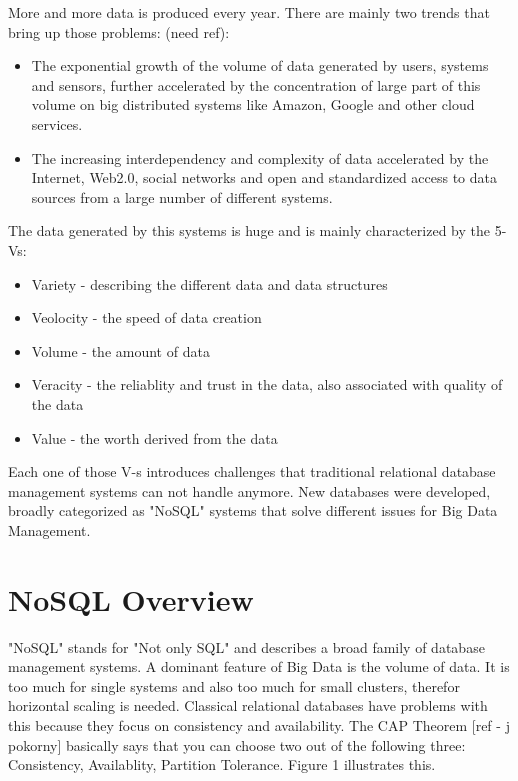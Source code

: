 \documentclass{acm_proc_article-sp}
\begin{document}
More and more data is produced every year. There are mainly two trends that bring up those problems: (need ref):
\begin{itemize}
	\item The exponential growth of the volume of data generated by users, systems and sensors, further accelerated by the concentration of large part of this volume on big distributed systems like Amazon, Google and other cloud services. 
	\item The increasing interdependency and complexity of data accelerated by the Internet, Web2.0, social networks and open and standardized access to data sources from a large number of different systems.
\end{itemize}

The data generated by this systems is huge and is mainly characterized by the 5-Vs:

\begin{itemize}
	\item Variety - describing the different data and data structures
	\item Veolocity - the speed of data creation
	\item Volume - the amount of data
	\item Veracity - the reliablity and trust in the data, also associated with quality of the data
	\item Value - the worth derived from the data
\end{itemize}

Each one of those V-s introduces challenges that traditional relational database management systems can not handle anymore. New databases were developed, broadly categorized as "NoSQL" systems that solve different issues for Big Data Management.

\section{NoSQL Overview}

"NoSQL" stands for "Not only SQL" and describes a broad family of database management systems. A dominant feature of Big Data is the volume of data. It is too much for single systems and also too much for small clusters, therefor horizontal scaling is needed. Classical relational databases have problems with this because they focus on consistency and availability. The CAP Theorem [ref - j pokorny] basically says that you can choose two out of the following three: Consistency, Availablity, Partition Tolerance. Figure 1 illustrates this.
\end{document}
